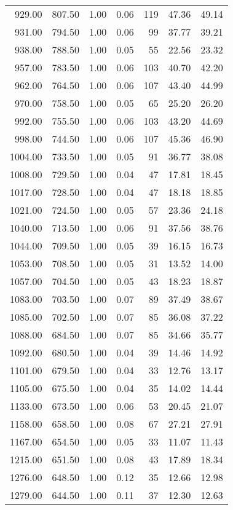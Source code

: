 \begin{table}
\begin{tabular}{rrrrrrr}
929.00 & 807.50 & 1.00 & 0.06 & 119 & 47.36 & 49.14 \\
931.00 & 794.50 & 1.00 & 0.06 & 99 & 37.77 & 39.21 \\
938.00 & 788.50 & 1.00 & 0.05 & 55 & 22.56 & 23.32 \\
957.00 & 783.50 & 1.00 & 0.06 & 103 & 40.70 & 42.20 \\
962.00 & 764.50 & 1.00 & 0.06 & 107 & 43.40 & 44.99 \\
970.00 & 758.50 & 1.00 & 0.05 & 65 & 25.20 & 26.20 \\
992.00 & 755.50 & 1.00 & 0.06 & 103 & 43.20 & 44.69 \\
998.00 & 744.50 & 1.00 & 0.06 & 107 & 45.36 & 46.90 \\
1004.00 & 733.50 & 1.00 & 0.05 & 91 & 36.77 & 38.08 \\
1008.00 & 729.50 & 1.00 & 0.04 & 47 & 17.81 & 18.45 \\
1017.00 & 728.50 & 1.00 & 0.04 & 47 & 18.18 & 18.85 \\
1021.00 & 724.50 & 1.00 & 0.05 & 57 & 23.36 & 24.18 \\
1040.00 & 713.50 & 1.00 & 0.06 & 91 & 37.56 & 38.76 \\
1044.00 & 709.50 & 1.00 & 0.05 & 39 & 16.15 & 16.73 \\
1053.00 & 708.50 & 1.00 & 0.05 & 31 & 13.52 & 14.00 \\
1057.00 & 704.50 & 1.00 & 0.05 & 43 & 18.23 & 18.87 \\
1083.00 & 703.50 & 1.00 & 0.07 & 89 & 37.49 & 38.67 \\
1085.00 & 702.50 & 1.00 & 0.07 & 85 & 36.08 & 37.22 \\
1088.00 & 684.50 & 1.00 & 0.07 & 85 & 34.66 & 35.77 \\
1092.00 & 680.50 & 1.00 & 0.04 & 39 & 14.46 & 14.92 \\
1101.00 & 679.50 & 1.00 & 0.04 & 33 & 12.76 & 13.17 \\
1105.00 & 675.50 & 1.00 & 0.04 & 35 & 14.02 & 14.44 \\
1133.00 & 673.50 & 1.00 & 0.06 & 53 & 20.45 & 21.07 \\
1158.00 & 658.50 & 1.00 & 0.08 & 67 & 27.21 & 27.91 \\
1167.00 & 654.50 & 1.00 & 0.05 & 33 & 11.07 & 11.43 \\
1215.00 & 651.50 & 1.00 & 0.08 & 43 & 17.89 & 18.34 \\
1276.00 & 648.50 & 1.00 & 0.12 & 35 & 12.66 & 12.98 \\
1279.00 & 644.50 & 1.00 & 0.11 & 37 & 12.30 & 12.63 \\
\bottomrule
\end{tabular}
\end{table}
